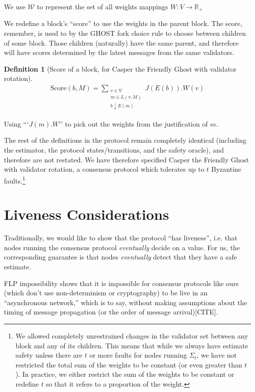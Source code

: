 \documentclass{article}
\theoremstyle{definition}
\newtheorem{defn}{Definition}[section]
\begin{document}
We use $\mathcal{W}$ to represent the set of all weights mappings $W:V \to \mathbb{R}_+$

We redefine a block's ``score'' to use the weights in the parent block. The score, remember, is used to by the GHOST fork choice rule to choose between children of some block. Those children (naturally) have the same parent, and therefore will have scores determined by the latest messages from the same validators.

\begin{defn}[Score of a block, for Casper the Friendly Ghost with validator rotation]
\begin{align}
\text{Score}(b, M) = \sum_{\substack{v \in V \\ m \in L(v,M) \\ b \downarrow E(m)}} J(E(b)).W(v)
\end{align}
\end{defn}

Using ```$J(m).W$'' to pick out the weights from the justification of $m$.

The rest of the definitions in the protocol remain completely identical (including the estimator, the protocol states/transitions, and the safety oracle), and therefore are not restated. We have therefore specified Casper the Friendly Ghost with validator rotation, a consensus protocol which tolerates up to $t$ Byzantine faults.\footnote{We allowed completely unrestrained changes in the validator set between any block and any of its children. This means that while we always have estimate safety unless there are $t$ or more faults for nodes running $\Sigma_t$, we have not restricted the total sum of the weights to be constant (or even greater than $t$). In practice, we either restrict the sum of the weights to be constant or redefine $t$ so that it refers to a proportion of the weight.}


\section{Liveness Considerations}

Traditionally, we would like to show that the protocol ``has liveness'', i.e. that nodes running the consensus protocol \emph{eventually} decide on a value. For us, the corresponding guarantee is that nodes \emph{eventually} detect that they have a safe estimate.

FLP impossibility shows that it is impossible for consensus protocols like ours (which don't use non-determinism or cryptography) to be live in an ``asynchronous network,'' which is to say, without making assumptions about the timing of message propagation (or the order of message arrival)[CITE].
\end{document}
